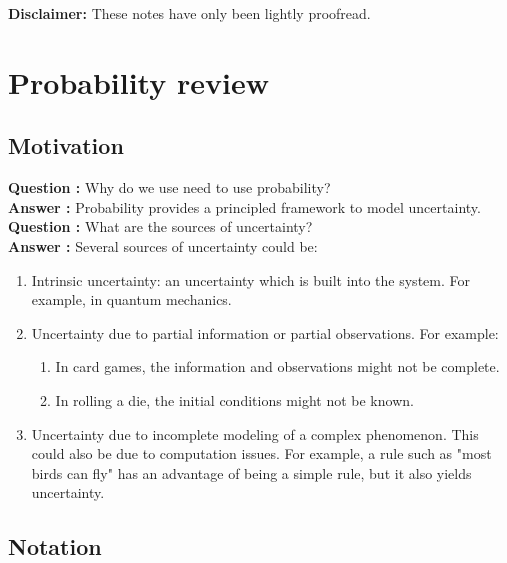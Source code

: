 \documentclass[12pt]{report}
\renewcommand{\emph}[1]{\color{violet}#1\color{black}{}}
\begin{document}
 
 

\maketitle

\textbf{Disclaimer:} These notes have only been lightly proofread.

\section{Probability review}

\subsection{Motivation}

\textbf{Question :} Why do we use need to use probability?\\
\noindent\textbf{Answer :} Probability provides a principled framework to model \emph{uncertainty}.\\

\noindent\textbf{Question :} What are the sources of uncertainty?\\
\noindent\textbf{Answer :} Several sources of uncertainty could be:
\begin{enumerate}
\item Intrinsic uncertainty: an uncertainty which is built into the system. For example, in quantum mechanics.
\item Uncertainty due to partial information or partial observations. For example:
\begin{enumerate} \item In card games, the information and observations might not be complete.
    \item In rolling a die, the initial conditions might not be known.
  \end{enumerate}
\item Uncertainty due to incomplete modeling of a complex phenomenon. This could also be due to computation issues. For example, a rule such as "most birds can fly" has an advantage of being a simple rule, but it also yields uncertainty.
  
\end{enumerate}

\subsection{Notation}
\end{document}
